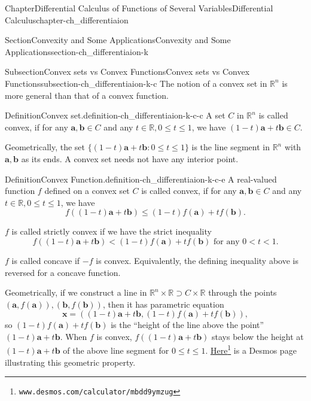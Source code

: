 \documentclass[oneside,10pt,]{book}
\numberwithin{equation}{section}
\newcommand{\lt}{<}
\begin{document}
\begin{chapterptx}{Chapter}{Differential Calculus of Functions of Several Variables}{}{Differential Calculus}{}{}{chapter-ch_differentiaion}
\begin{sectionptx}{Section}{Convexity and Some Applications}{}{Convexity and Some Applications}{}{}{section-ch_differentiaion-k}
%
%
\typeout{************************************************}
\typeout{************************************************}
%
\begin{subsectionptx}{Subsection}{Convex sets vs Convex Functions}{}{Convex sets vs Convex Functions}{}{}{subsection-ch_differentiaion-k-c}
The notion of a convex set in \(\mathbb R^{n}\) is more general than that of a convex function.%
\begin{definition}{Definition}{Convex set.}{definition-ch_differentiaion-k-c-c}%
A set \(C\) in \(\mathbb R^{n}\) is called convex, if for any \(\mathbf a, \mathbf b\in C\) and any \(t\in \mathbb R, 0\le t \le 1\), we have \((1-t)\mathbf a + t \mathbf b \in C\).%
\end{definition}
Geometrically, the set \(\{(1-t)\mathbf a + t \mathbf b: 0\le t \le 1\}\) is the line segment in \(\mathbb R^{n}\) with \(\mathbf a, \mathbf b\) as its ends. A convex set needs not have any interior point.%
\begin{definition}{Definition}{Convex Function.}{definition-ch_differentiaion-k-c-e}%
A real-valued function \(f\) defined on a convex set \(C\) is called convex, if for any \(\mathbf a, \mathbf b\in C\) and any \(t\in \mathbb R, 0\le t \le 1\), we have%
\begin{equation*}
f((1-t)\mathbf a + t \mathbf b)\le (1-t) f(\mathbf a) + t f(\mathbf b).
\end{equation*}
%
\par
\(f\) is called strictly convex if we have the strict inequality%
\begin{equation*}
f((1-t)\mathbf a + t \mathbf b)\lt (1-t) f(\mathbf a) + t f(\mathbf b) \text{ for any } 0\lt t \lt 1.
\end{equation*}
%
\par
\(f\) is called concave if \(-f\) is convex. Equivalently, the defining inequality above is reversed for a concave function.%
\end{definition}
Geometrically, if we construct a line in \(\mathbb R^{n}\times \mathbb R\supset C\times \mathbb R\) through the points \((\mathbf a, f(\mathbf a)), (\mathbf b, f(\mathbf b))\), then it has parametric equation%
\begin{equation*}
\mathbf x=((1-t)\mathbf a + t \mathbf b, (1-t) f(\mathbf a) + t f(\mathbf b)),
\end{equation*}
so \((1-t) f(\mathbf a) + t f(\mathbf b)\) is the ``height of the line above the point'' \((1-t)\mathbf a + t \mathbf b\). When \(f\) is convex, \(f((1-t)\mathbf a + t \mathbf b)\) stays below the height at \((1-t)\mathbf a + t \mathbf b\) of the above line segment for \(0\le t\le 1\). \href{https://www.desmos.com/calculator/mbdd9ymzug}{Here}\footnote{\nolinkurl{www.desmos.com/calculator/mbdd9ymzug}\label{fn-ch_differentiaion-k-c-f-l}} is a Desmos page illustrating this geometric property.%

\end{subsectionptx}
\end{sectionptx}
\end{chapterptx}
\end{document}
